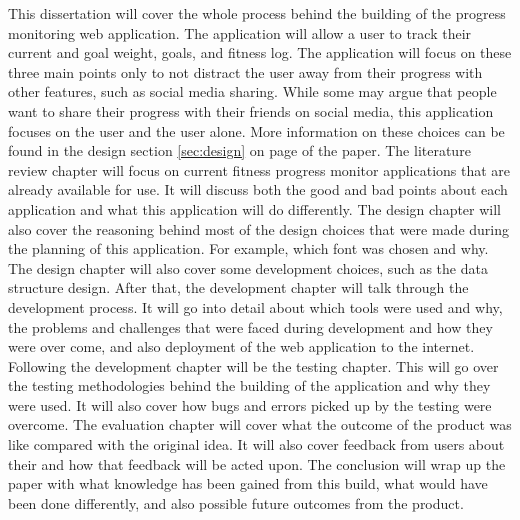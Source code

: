 This dissertation will cover the whole process behind the building of the progress monitoring web application. The application will allow a user to track their current and goal weight, goals, and fitness log. The application will focus on these three main points only to not distract the user away from their progress with other features, such as social media sharing. While some may argue that people want to share their progress with their friends on social media, this application focuses on the user and the user alone. More information on these choices can be found in the design section \ref{sec:design} on page \pageref{sec:design} of the paper. The literature review chapter will focus on current fitness progress monitor applications that are already available for use. It will discuss both the good and bad points about each application and what this application will do differently. The design chapter will also cover the reasoning behind most of the design choices that were made during the planning of this application. For example, which font was chosen and why. The design chapter will also cover some development choices, such as the data structure design. After that, the development chapter will talk through the development process. It will go into detail about which tools were used and why, the problems and challenges that were faced during development and how they were over come, and also deployment of the web application to the internet. Following the development chapter will be the testing chapter. This will go over the testing methodologies behind the building of the application and why they were used. It will also cover how bugs and errors picked up by the testing were overcome. The evaluation chapter will cover what the outcome of the product was like compared with the original idea. It will also cover feedback from users about their and how that feedback will be acted upon. The conclusion will wrap up the paper with what knowledge has been gained from this build, what would have been done differently, and also possible future outcomes from the product. 